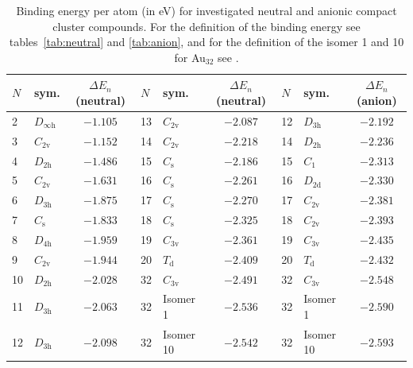 \begin{table}[htbp]
	\centering
    \setlength{\tabcolsep}{3pt}
    \footnotesize{
    \caption{Binding energy per atom (in eV) for investigated neutral and
    anionic compact cluster compounds. For the definition of the binding energy
    see tables~\ref{tab:neutral} and \ref{tab:anion}, and for the definition of
    the isomer 1 and 10 for Au$_{32}$ see \citeauthor{Jalbout_LowSymmetryStructuresAu_2008}.\autocite{Jalbout_LowSymmetryStructuresAu_2008}}
	\label{tab:Aun}
	\begin{tabular}{llcllcllc}
		\toprule
		$N$  & sym.  & $\Delta E_n$(neutral) & $N$  & sym.  & $\Delta E_n$(neutral) & $N$  & sym.  & $\Delta E_n$(anion) \\
		\midrule
2  & $D_\mathrm{\infty h}$ & $-1.105$ & 13 & $C_\mathrm{2v}$ & $-2.087$ & 12 & $D_\mathrm{3h}$  & $-2.192$ \\
3  & $C_\mathrm{2v}$       & $-1.152$ & 14 & $C_\mathrm{2v}$ & $-2.218$ & 14 & $D_\mathrm{2h}$  & $-2.236$ \\
4  & $D_\mathrm{2h}$       & $-1.486$ & 15 & $C_\mathrm{s}$  & $-2.186$ & 15 & $C_\mathrm{1}$     & $-2.313$ \\
5  & $C_\mathrm{2v}$       & $-1.631$ & 16 & $C_\mathrm{s}$  & $-2.261$ & 16 & $D_\mathrm{2d}$  & $-2.330$ \\
6  & $D_\mathrm{3h}$       & $-1.875$ & 17 & $C_\mathrm{s}$  & $-2.270$ & 17 & $C_\mathrm{2v}$  & $-2.381$ \\
7  & $C_\mathrm{s}$        & $-1.833$ & 18 & $C_\mathrm{s}$  & $-2.325$ & 18 & $C_\mathrm{2v}$  & $-2.393$ \\
8  & $D_\mathrm{4h}$       & $-1.959$ & 19 & $C_\mathrm{3v}$ & $-2.361$ & 19 & $C_\mathrm{3v}$  & $-2.435$ \\
9  & $C_\mathrm{2v}$       & $-1.944$ & 20 & $T_\mathrm{d}$  & $-2.409$ & 20 & $T_\mathrm{d}$     & $-2.432$ \\
10 & $D_\mathrm{2h}$       & $-2.028$ & 32 & $C_\mathrm{3v}$ & $-2.491$ & 32 & $C_\mathrm{3v}$  & $-2.548$ \\
11 & $D_\mathrm{3h}$       & $-2.063$ & 32 & Isomer 1        & $-2.536$ & 32 & Isomer 1  & $-2.590$ \\
12 & $D_\mathrm{3h}$       & $-2.098$ & 32 & Isomer 10       & $-2.542$ & 32 & Isomer 10 & $-2.593$ \\
		\bottomrule
    \end{tabular}}
\end{table}



